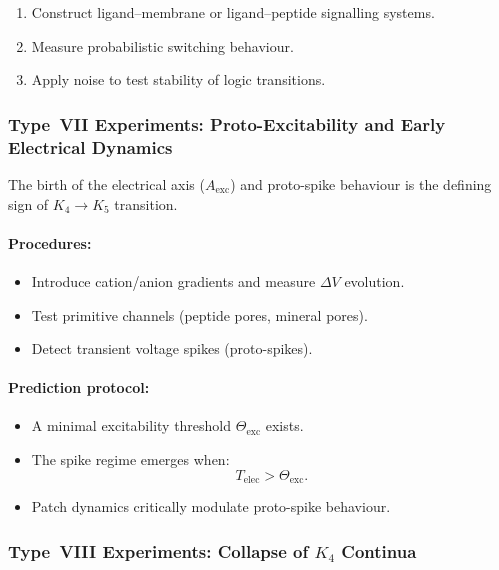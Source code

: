\begin{enumerate}
    \item Construct ligand–membrane or ligand–peptide signalling systems.
    \item Measure probabilistic switching behaviour.
    \item Apply noise to test stability of logic transitions.
\end{enumerate}



\subsubsection{Type~VII Experiments: Proto-Excitability and Early Electrical Dynamics}

The birth of the electrical axis ($A_{\mathrm{exc}}$) and proto-spike 
behaviour is the defining sign of $K_4 \rightarrow K_5$ transition.

\paragraph{Procedures:}

\begin{itemize}
    \item Introduce cation/anion gradients and measure $\Delta V$ evolution.
    \item Test primitive channels (peptide pores, mineral pores).
    \item Detect transient voltage spikes (proto-spikes).
\end{itemize}

\paragraph{Prediction protocol:}

\begin{itemize}
    \item A minimal excitability threshold $\Theta_{\mathrm{exc}}$ exists.
    \item The spike regime emerges when:
          \[
              T_{\mathrm{elec}} > \Theta_{\mathrm{exc}}.
          \]
    \item Patch dynamics critically modulate proto-spike behaviour.
\end{itemize}



\subsubsection{Type~VIII Experiments: Collapse of \texorpdfstring{$K_4$}{K_4} Continua}

